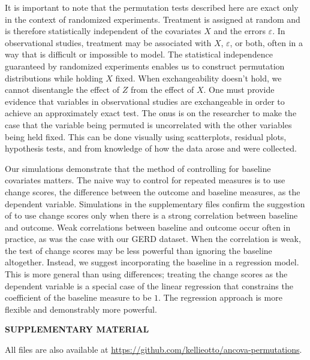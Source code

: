\documentclass[12pt]{article}
\begin{document}
It is important to note that the permutation tests described here are exact only in the context of randomized experiments.
Treatment is assigned at random and is therefore statistically independent of the covariates $X$ and the errors $\varepsilon$.
In observational studies, treatment may be associated with $X$, $\varepsilon$, or both, often in a way that is difficult or impossible to model.
The statistical independence guaranteed by randomized experiments enables us to construct permutation distributions while holding $X$ fixed.
When exchangeability doesn't hold, we cannot disentangle the effect of $Z$ from the effect of $X$.
One must provide evidence that variables in observational studies are exchangeable in order to achieve an approximately exact test.
The onus is on the researcher to make the case that the variable being permuted is uncorrelated with the other variables being held fixed.
This can be done visually using scatterplots, residual plots, hypothesis tests, and from knowledge of how the data arose and were collected.

Our simulations demonstrate that the method of controlling for baseline covariates matters.
The naive way to control for repeated measures is to use change scores, the difference between the outcome and baseline measures, as the dependent variable.
Simulations in the supplementary files confirm the suggestion of \cite{frison_repeated_1992} to use change scores only when there is a strong correlation between baseline and outcome.
Weak correlations between baseline and outcome occur often in practice, as was the case with our GERD dataset.
When the correlation is weak, the test of change scores may be less powerful than ignoring the baseline altogether.
Instead, we suggest incorporating the baseline in a regression model.
This is more general than using differences;
treating the change scores as the dependent variable is a special case of the linear regression that constrains the coefficient of the baseline measure to be $1$.
The regression approach is more flexible and demonstrably more powerful.



\bigskip
\begin{center}
{\large\bf SUPPLEMENTARY MATERIAL}
\end{center}
All files are also available at \url{https://github.com/kellieotto/ancova-permutations}.
\end{document}
